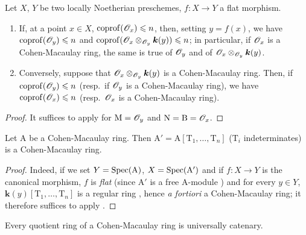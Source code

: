 \begin{corollary}[6.3.5]
\label{IV.6.3.5}
Let $X$, $Y$ be two locally Noetherian preschemes, $f:X\to Y$ a flat morphism.
\begin{enumerate}[label=\upshape(\roman*)]
  \item If, at a point $x\in X$, $\operatorname{coprof}(\mathscr{O}_x)\leqslant n$, then, setting $y=f(x)$, we have $\operatorname{coprof}(\mathscr{O}_y)\leqslant n$ and $\operatorname{coprof}(\mathscr{O}_x\otimes_{\mathscr{O}_y}\boldsymbol{k}(y))\leqslant n$; in particular, if $\mathscr{O}_x$ is a Cohen-Macaulay ring, the same is true of $\mathscr{O}_y$ and of $\mathscr{O}_x\otimes_{\mathscr{O}_y}\boldsymbol{k}(y)$.
  \item Conversely, suppose that $\mathscr{O}_x\otimes_{\mathscr{O}_y}\boldsymbol{k}(y)$ is a Cohen-Macaulay ring.
Then, if $\operatorname{coprof}(\mathscr{O}_y)\leqslant n$ \textnormal{(resp.\ }if $\mathscr{O}_y$ is a Cohen-Macaulay ring\textnormal{)}, we have $\operatorname{coprof}(\mathscr{O}_x)\leqslant n$ \textnormal{(resp.\ }$\mathscr{O}_x$ is a Cohen-Macaulay ring\textnormal{)}.
\end{enumerate}
\end{corollary}

\begin{proof}
It suffices to apply  for $\mathrm{M}=\mathscr{O}_y$ and $\mathrm{N}=\mathrm{B}=\mathscr{O}_x$.
\end{proof}

\begin{corollary}[6.3.6]
\label{IV.6.3.6}
Let $\mathrm{A}$ be a Cohen-Macaulay ring.
Then $\mathrm{A}'=\mathrm{A}[\mathrm{T}_1,\ldots,\mathrm{T}_n]$ ($\mathrm{T}_i$ indeterminates) is a Cohen-Macaulay ring.
\end{corollary}

\begin{proof}
Indeed, if we set $Y=\operatorname{Spec}(\mathrm{A})$, $X=\operatorname{Spec}(\mathrm{A}')$ and if $f:X\to Y$ is the canonical morphism, $f$ is \emph{flat} (since $\mathrm{A}'$ is a free $\mathrm{A}$-module ) and for every $y\in Y$, $\boldsymbol{k}(y)[\mathrm{T}_1,\ldots,\mathrm{T}_n]$ is a regular ring , hence \emph{a fortiori} a Cohen-Macaulay ring; it therefore suffices to apply .
\end{proof}

\begin{corollary}[6.3.7]
\label{IV.6.3.7}
Every quotient ring of a Cohen-Macaulay ring is universally catenary.
\end{corollary}

